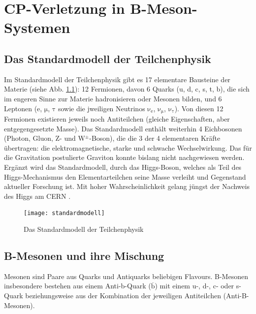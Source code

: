 \chapter{CP-Verletzung in B-Meson-Systemen} \label{kap_cp-verletzung}

\section{Das Standardmodell der Teilchenphysik}
Im Standardmodell der Teilchenphysik gibt es 17 elementare Bausteine der Materie (siehe Abb. \ref{fig:standardmodell}): 12 Fermionen, davon 6 Quarks (u, d, c, s, t, b), die sich im engeren Sinne zur Materie hadronisieren oder Mesonen bilden, und 6 Leptonen (e, $\mathrm{\mu}$, $\mathrm{\tau}$ sowie die jweiligen Neutrinos $\mathrm{\nu_e}$, $\mathrm{\nu_{\mu}}$, $\mathrm{\nu_{\tau}}$). Von diesen 12 Fermionen existieren jeweils noch Antiteilchen (gleiche Eigenschaften, aber entgegengesetzte Masse). Das Standardmodell enthält weiterhin 4 Eichbosonen (Photon, Gluon, Z- und W$^{\pm}$-Boson), die die 3 der 4 elementaren Kräfte übertragen: die elektromagnetische, starke und schwache Wechselwirkung. Das für die Gravitation postulierte Graviton konnte bislang nicht nachgewiesen werden. Ergänzt wird das Standardmodell, durch das Higgs-Boson, welches als Teil des Higgs-Mechanismus den Elementarteilchen seine Masse verleiht und Gegenstand aktueller Forschung ist. Mit hoher Wahrscheinlichkeit gelang jüngst der Nachweis des Higgs am CERN \cite{higgs}.

\begin{figure}[hptb]
\centering
\texttt{[image: standardmodell]}
\caption{Das Standardmodell der Teilchenphysik \cite{wiki_standard}}
\label{fig:standardmodell}
\end{figure}

\section{B-Mesonen und ihre Mischung}
Mesonen sind Paare aus Quarks und Antiquarks beliebigen Flavours. B-Mesonen insbesondere bestehen aus einem Anti-b-Quark ($\mathrm{\overline{b}}$) mit einem u-, d-, c- oder s-Quark beziehungsweise aus der Kombination der jeweiligen Antiteilchen (Anti-B-Mesonen).


